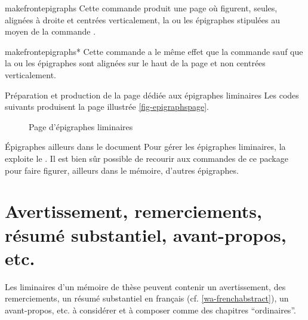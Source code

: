 \begin{docCommand}{makefrontepigraphs}{}
  Cette commande produit une page où figurent, seules, alignées à droite et
  centrées verticalement, la ou les épigraphes stipulées au moyen de la
  commande .
\end{docCommand}
%
\begin{docCommand}{makefrontepigraphs*}{}
  Cette commande a le même effet que la commande 
  sauf que la ou les épigraphes sont alignées sur le haut de la page et non
  centrées verticalement.
\end{docCommand}

\begin{dbexample}{Préparation et production de la page dédiée aux épigraphes
    liminaires}{}
  \NoAutoSpacing%
  Les codes suivants produisent la page illustrée \vref{fig-epigraphspage}.
\end{dbexample}

\begin{figure}[htbp]
  \centering
  \caption{Page d'épigraphes liminaires}
  \label{fig-epigraphspage}
\end{figure}

\begin{dbremark}{Épigraphes ailleurs dans le document}{}
  Pour gérer les épigraphes liminaires, la \yatCl{} exploite le
   . Il est bien sûr
  possible de recourir aux commandes de ce package pour faire figurer, ailleurs
  dans le mémoire, d'autres épigraphes.
\end{dbremark}

\section{Avertissement, remerciements, résumé substantiel, avant-propos, etc.}
%
%
%
%

Les \glspl{liminaire} d'un mémoire de thèse peuvent contenir un avertissement,
des remerciements, un résumé substantiel en français
(cf. \vref{wa-frenchabstract}), un avant-propos, etc.
à considérer et à composer comme des chapitres \enquote{ordinaires}.

